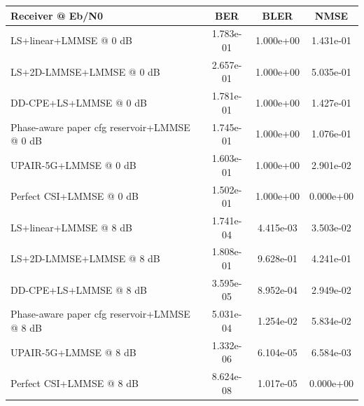 \begin{tabular}{lccc}
\toprule
Receiver @ Eb/N0 & BER & BLER & NMSE \\
\midrule
LS+linear+LMMSE @ 0 dB & 1.783e-01 & 1.000e+00 & 1.431e-01 \\
LS+2D-LMMSE+LMMSE @ 0 dB & 2.657e-01 & 1.000e+00 & 5.035e-01 \\
DD-CPE+LS+LMMSE @ 0 dB & 1.781e-01 & 1.000e+00 & 1.427e-01 \\
Phase-aware paper cfg reservoir+LMMSE @ 0 dB & 1.745e-01 & 1.000e+00 & 1.076e-01 \\
UPAIR-5G+LMMSE @ 0 dB & 1.603e-01 & 1.000e+00 & 2.901e-02 \\
Perfect CSI+LMMSE @ 0 dB & 1.502e-01 & 1.000e+00 & 0.000e+00 \\
\midrule
LS+linear+LMMSE @ 8 dB & 1.741e-04 & 4.415e-03 & 3.503e-02 \\
LS+2D-LMMSE+LMMSE @ 8 dB & 1.808e-01 & 9.628e-01 & 4.241e-01 \\
DD-CPE+LS+LMMSE @ 8 dB & 3.595e-05 & 8.952e-04 & 2.949e-02 \\
Phase-aware paper cfg reservoir+LMMSE @ 8 dB & 5.031e-04 & 1.254e-02 & 5.834e-02 \\
UPAIR-5G+LMMSE @ 8 dB & 1.332e-06 & 6.104e-05 & 6.584e-03 \\
Perfect CSI+LMMSE @ 8 dB & 8.624e-08 & 1.017e-05 & 0.000e+00 \\
\bottomrule
\end{tabular}
